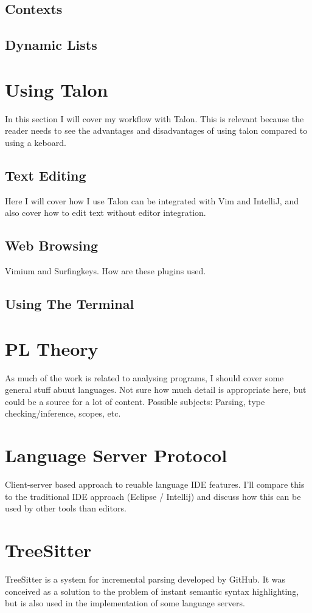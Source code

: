 \documentclass[a4paper,english]{ifimaster}
\begin{document}
\subsection{Contexts}
\subsection{Dynamic Lists}

\section{Using Talon}
In this section I will cover my workflow with Talon. This is relevant because the reader needs to see the advantages and disadvantages of using talon compared to using a keboard.
\subsection{Text Editing}
Here I will cover how I use Talon can be integrated with Vim and IntelliJ, and also cover how to edit text without editor integration.
\subsection{Web Browsing}
Vimium and Surfingkeys. How are these plugins used.
\subsection{Using The Terminal}

\section{PL Theory}
As much of the work is related to analysing programs, I should cover some general stuff abuut languages.
Not sure how much detail is appropriate here, but could be a source for a lot of content.
Possible subjects: Parsing, type checking/inference, scopes, etc.

\section{Language Server Protocol}
Client-server based approach to reuable language IDE features.
I'll compare this to the traditional IDE approach (Eclipse / Intellij)
and discuss how this can be used by other tools than editors.

\section{TreeSitter}
TreeSitter is a system for incremental parsing developed by GitHub.
It was conceived as a solution to the problem of instant semantic syntax highlighting,
but is also used in the implementation of some language servers.
\end{document}
